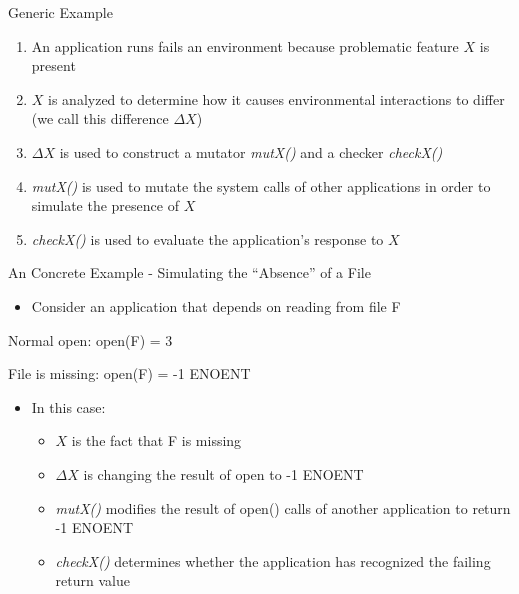 \documentclass[pdf]{beamer}
\begin{document}
\begin{frame}{Generic Example}
  \begin{enumerate}
    \item{An application runs fails an environment because problematic
      feature $X$ is present}
    \item{$X$ is analyzed to determine how it causes environmental
        interactions to differ (we call this difference $\Delta X$)}
    \item{$\Delta X$ is used to construct a mutator \textit{mutX()} and
      a checker \textit{checkX()}}
    \item{\textit{mutX()} is used to mutate the system calls of other
      applications in order to simulate the presence of $X$}
    \item{\textit{checkX()} is used to evaluate the application's response
      to $X$}
  \end{enumerate}
\end{frame}


\begin{frame}{An Concrete Example - Simulating the ``Absence'' of a File}
  \begin{itemize}
  \item{Consider an application that depends on reading from file F}
  \end{itemize}

  Normal open: open(F) = 3

  File is missing: open(F) = -1 ENOENT

  \begin{itemize}
  \item{In this case:}
    \begin{itemize}
      \item{$X$ is the fact that F is missing}
      \item{$\Delta X$ is changing the result of open to -1 ENOENT}
      \item{\textit{mutX()} modifies the result of open() calls of another
        application to return -1 ENOENT}
      \item{\textit{checkX()} determines whether the application has
        recognized the failing return value}
    \end{itemize}
  \end{itemize}
\end{frame}
\end{document}
